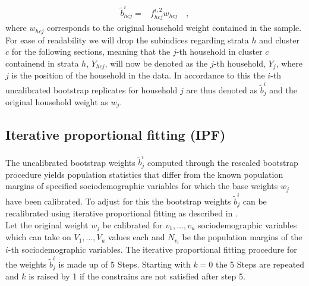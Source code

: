 \documentclass{scrartcl}\usepackage[]{graphicx}\usepackage[]{color}
\begin{document}
\begin{align*}
  \tilde{b}_{hcj}^{i} =& f^{i,2}_{hcj} w_{hcj} \quad,
\end{align*}
where $w_{hcj}$ corresponds to the original household weight contained in the sample.\\

For ease of readability we will drop the subindices regarding strata $h$ and cluster $c$ for the following sections, meaning that the $j$-th household in cluster $c$ containend in strata $h$, $Y_{hcj}$, will now be denoted as the $j$-th household, $Y_{j}$, where $j$ is the position of the household in the data. In accordance to this the $i$-th uncalibrated bootstrap replicates for household $j$ are thus denoted as $\tilde{b}_j^{i}$ and the original household weight as $w_j$.


\subsection{Iterative proportional fitting (IPF)}
The uncalibrated bootstrap weights $\tilde{b}_j^{i}$ computed through the rescaled bootstrap procedure yields population statistics that differ from the known population margins of specified sociodemographic variables for which the base weights $w_j$ have been calibrated. To adjust for this the bootstrap weights $\tilde{b}_{j}^{i}$ can be recalibrated using iterative proportional fitting as described in \citep{mekogu2016}.\\

Let the original weight $w_{j}$ be calibrated for $v_1,\ldots,v_u$ sociodemographic variables which can take on $V_1,\ldots,V_u$ values each and $N_{v_i}$ be the population margins of the $i$-th sociodemographic variables. The iterative proportional fitting procedure for the weights $\tilde{b}_j^{i}$ is made up of 5 Steps. Starting with $k=0$ the 5 Steps are repeated and $k$ is raised by 1 if the constrains are not satisfied after step 5.
\end{document}
